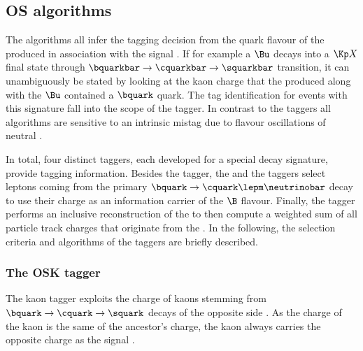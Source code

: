 \subsection{\Acl*{OS} algorithms}
\label{sec:flavour_tagging:os}

The \OS algorithms all infer the tagging decision from the quark flavour of the
\bhadron produced in association with the signal \Bmeson. If for example a $\Bu$
decays into a $\Kp X$ final state through $\bquarkbar \to \cquarkbar \to
\squarkbar$ transition, it can unambiguously be stated by looking at the kaon
charge that the \bhadron produced along with the $\Bu$ contained a $\bquark$
quark. The tag identification for events with this signature fall into the scope
of the \OSK tagger. In contrast to the \SS taggers all \OS algorithms are
sensitive to an intrinsic mistag due to flavour oscillations of neutral \Bmesons.

In total, four distinct \OS taggers, each developed for a special \OS decay
signature, provide tagging information. Besides the \OSK tagger, the \OSe and
the \OSm taggers select leptons coming from the primary $\bquark \to \cquark
\lepm \neutrinobar$ decay to use their charge as an information carrier of the
$\B$ flavour. Finally, the \OSvtx tagger performs an inclusive reconstruction of
the \OS \SV to then compute a weighted sum of all particle track charges that
originate from the \SV. In the following, the selection criteria and algorithms
of the \OS taggers are briefly described.
 
\subsubsection{The \acl*{OSK} tagger}
\label{sec:flavour_tagging:os:kaon}

The kaon tagger exploits the charge of kaons stemming from $\bquark \to
\cquark \to \squark$ decays of the opposite side \bhadron. As the charge of the
kaon is the same of the ancestor's charge, the kaon always carries the opposite
charge as the signal \Bmeson.

